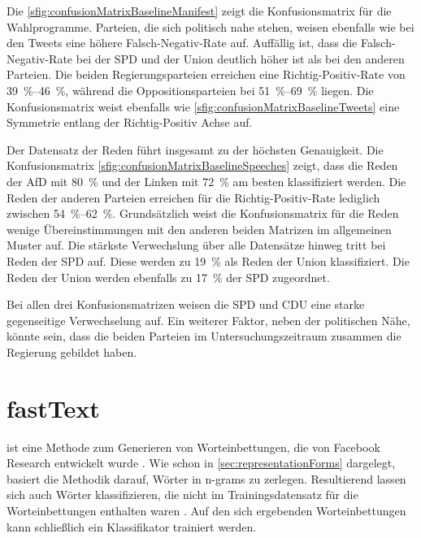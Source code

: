 Die \autoref{sfig:confusionMatrixBaselineManifest} zeigt die Konfusionsmatrix für die Wahlprogramme. Parteien, die sich politisch nahe stehen, weisen ebenfalls wie bei den Tweets eine höhere Falsch-Negativ-Rate auf. Auffällig ist, dass die Falsch-Negativ-Rate bei der \ac{SPD} und der Union deutlich höher ist als bei den anderen Parteien. Die beiden Regierungsparteien erreichen eine Richtig-Positiv-Rate von \SIrange{39}{46}{\percent}, während die Oppositionsparteien bei \SIrange{51}{69}{\percent} liegen. Die Konfusionsmatrix weist ebenfalls wie \autoref{sfig:confusionMatrixBaselineTweets} eine Symmetrie entlang der Richtig-Positiv Achse auf.

Der Datensatz der Reden führt insgesamt zu der höchsten Genauigkeit. Die Konfusionsmatrix \autoref{sfig:confusionMatrixBaselineSpeeches} zeigt, dass die Reden der \ac{AfD} mit \SI{80}{\percent} und der Linken mit \SI{72}{\percent} am besten klassifiziert werden. Die Reden der anderen Parteien erreichen für die Richtig-Positiv-Rate lediglich zwischen \SIrange{54}{62}{\percent}. Grundsätzlich weist die Konfusionsmatrix für die Reden wenige Übereinstimmungen mit den anderen beiden Matrizen im allgemeinen Muster auf. Die stärkste Verwechslung über alle Datensätze hinweg tritt bei Reden der \ac{SPD} auf. Diese werden zu \SI{19}{\percent} als Reden der Union klassifiziert. Die Reden der Union werden ebenfalls zu \SI{17}{\percent} der \ac{SPD} zugeordnet. 

Bei allen drei Konfusionsmatrizen weisen die \ac{SPD} und \ac{CDU} eine starke gegenseitige Verwechselung auf. Ein weiterer Faktor, neben der politischen Nähe, könnte sein, dass die beiden Parteien im Untersuchungszeitraum zusammen die Regierung gebildet haben.

\section{fastText} \label{sec:trainingFastText}

\ft ist eine Methode zum Generieren von Worteinbettungen, die von Facebook Research entwickelt wurde \autocite{joulin_bag_2016}. Wie schon in \autoref{sec:representationForms} dargelegt, basiert die Methodik darauf, Wörter in n-grams zu zerlegen. Resultierend lassen sich auch Wörter klassifizieren, die nicht im Trainingsdatensatz für die Worteinbettungen enthalten waren \autocite{guhr_training_2020}. Auf den sich ergebenden Worteinbettungen kann schließlich ein Klassifikator trainiert werden.

